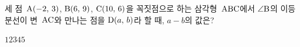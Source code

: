 세 점~$\mathrm{A}(-2,\,3)$, $\mathrm{B}(6,\,9)$, $\mathrm{C}(10,\,6)$을 꼭짓점으로 하는 삼각형~$\mathrm{ABC}$에서 $\angle\mathrm{B}$의 이등분선이 변~$\mathrm{AC}$와 만나는 점을 $\mathrm{D}(a,\,b)$라 할 때, $a-b$의 값은?
\begin{choices32}{$1$}{$2$}{$3$}{$4$}{$5$}\end{choices32}
